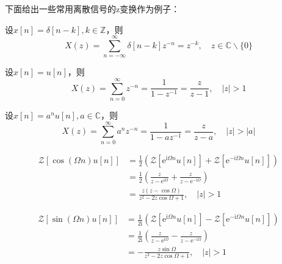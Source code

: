 下面给出一些常用离散信号的z变换作为例子：
\begin{example}[单位脉冲序列的z变换]
    设$x[n]=\delta[n-k],k\in\mathbb{Z}$，则
    \[X(z)=\sum_{n=-\infty}^{\infty}\delta[n-k]z^{-n}=z^{-k},\quad z\in\mathbb{C}\backslash\{0\}\]
\end{example}
\begin{example}[单位阶跃序列的z变换]
    设$x[n]=u[n]$，则
    \[X(z)=\sum_{n=0}^{\infty}z^{-n}=\frac{1}{1-z^{-1}}=\frac{z}{z-1},\quad |z|>1\]
\end{example}
\begin{example}[指数序列的z变换]
    设$x[n]=a^n u[n],a\in\mathbb{C}$，则
    \[X(z)=\sum_{n=0}^{\infty}a^n z^{-n}=\frac{1}{1-a z^{-1}}=\frac{z}{z-a},\quad |z|>|a|\]
\end{example}
\begin{example}[单边余弦序列的z变换]\label{exmp:causual_cos_z}
    \begin{align*}
        \mathcal{Z} \left[\cos(\Omega n)u[n]\right]&=\frac{1}{2}\left(\mathcal{Z} \left[\mathrm{e}^{\mathrm{i}\Omega n}u[n]\right]+\mathcal{Z} \left[\mathrm{e}^{-\mathrm{i}\Omega n}u[n]\right]\right)\\
        &=\frac{1}{2}\left(\frac{z}{z-\mathrm{e}^{\mathrm{i}\Omega}}+\frac{z}{z-\mathrm{e}^{-\mathrm{i}\Omega}}\right)\\
        &=\frac{z(z-\cos\Omega)}{z^2-2z\cos\Omega+1},\quad |z|>1
    \end{align*}
\end{example}
\begin{example}[单边正弦序列的z变换]\label{exmp:casual_sin_z}
    \begin{align*}
        \mathcal{Z} \left[\sin(\Omega n)u[n]\right]&=\frac{1}{2\mathrm{i}}\left(\mathcal{Z} \left[\mathrm{e}^{\mathrm{i}\Omega n}u[n]\right]-\mathcal{Z} \left[\mathrm{e}^{-\mathrm{i}\Omega n}u[n]\right]\right)\\
        &=\frac{1}{2\mathrm{i}}\left(\frac{z}{z-\mathrm{e}^{\mathrm{i}\Omega}}-\frac{z}{z-\mathrm{e}^{-\mathrm{i}\Omega}}\right)\\
        &=-\frac{z\sin\Omega}{z^2-2z\cos\Omega+1},\quad |z|>1
    \end{align*}
\end{example}

